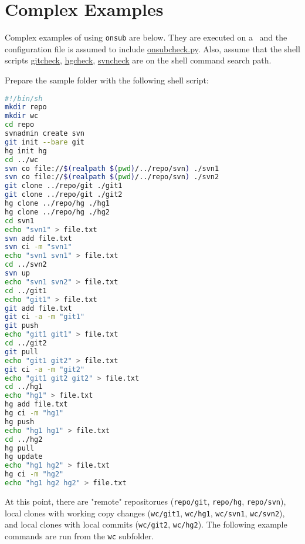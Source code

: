 \section{Complex Examples}

Complex examples of using \lstinline{onsub} are below. They are executed on a \Mac\ and the configuration file is assumed to include \href{https://bitbucket.org/sawolford/onsub/src/master/config/onsubcheck.py}{onsubcheck.py}. Also, assume that the shell scripts \href{https://bitbucket.org/sawolford/onsub/src/master/scripts/gitcheck.py}{gitcheck}, \href{https://bitbucket.org/sawolford/onsub/src/master/scripts/hgcheck.py}{hgcheck}, \href{https://bitbucket.org/sawolford/onsub/src/master/scripts/svncheck.py}{svncheck} are on the shell command search path.

Prepare the sample folder with the following shell script:

\begin{snugshade}
\begin{lstlisting}[language=bash]	
#!/bin/sh
mkdir repo
mkdir wc
cd repo
svnadmin create svn
git init --bare git
hg init hg
cd ../wc
svn co file://$(realpath $(pwd)/../repo/svn) ./svn1
svn co file://$(realpath $(pwd)/../repo/svn) ./svn2
git clone ../repo/git ./git1
git clone ../repo/git ./git2
hg clone ../repo/hg ./hg1
hg clone ../repo/hg ./hg2
cd svn1
echo "svn1" > file.txt
svn add file.txt
svn ci -m "svn1"
echo "svn1 svn1" > file.txt
cd ../svn2
svn up
echo "svn1 svn2" > file.txt
cd ../git1
echo "git1" > file.txt
git add file.txt
git ci -a -m "git1"
git push
echo "git1 git1" > file.txt
cd ../git2
git pull
echo "git1 git2" > file.txt
git ci -a -m "git2"
echo "git1 git2 git2" > file.txt
cd ../hg1
echo "hg1" > file.txt
hg add file.txt
hg ci -m "hg1"
hg push
echo "hg1 hg1" > file.txt
cd ../hg2
hg pull
hg update
echo "hg1 hg2" > file.txt
hg ci -m "hg2"
echo "hg1 hg2 hg2" > file.txt
\end{lstlisting}
\end{snugshade}

At this point, there are "remote" repositorues (\lstinline{repo/git}, \lstinline{repo/hg}, \lstinline{repo/svn}), local clones with working copy changes (\lstinline{wc/git1}, \lstinline{wc/hg1}, \lstinline{wc/svn1}, \lstinline{wc/svn2}), and local clones with local commits (\lstinline{wc/git2}, \lstinline{wc/hg2}). The following example commands are run from the \lstinline{wc} subfolder.

\subsection{\Git}

